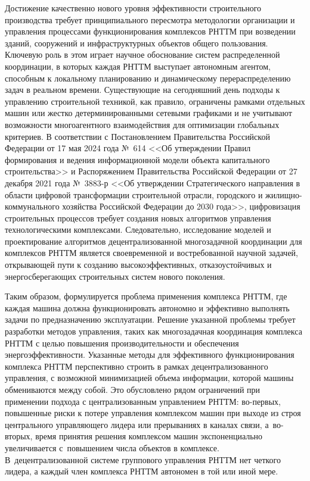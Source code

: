 Достижение качественно нового уровня эффективности строительного производства требует принципиального пересмотра методологии организации и управления процессами функционирования комплексов РНТТМ при возведении зданий, сооружений и инфраструктурных объектов общего пользования. Ключевую роль в этом играет научное обоснование систем распределенной координации, в которых каждая РНТТМ выступает автономным агентом, способным к локальному планированию и динамическому перераспределению задач в реальном времени. Существующие на сегодняшний день подходы к управлению строительной техникой, как правило, ограничены рамками отдельных машин или жестко детерминированными сетевыми графиками и не учитывают возможности многоагентного взаимодействия для оптимизации глобальных критериев. В соответствии с Постановлением Правительства Российской Федерации от 17 мая 2024 года №~614 <<Об утверждении Правил формирования и ведения информационной модели объекта капитального строительства>> и Распоряжением Правительства Российской Федерации от 27 декабря 2021 года №~3883-р <<Об утверждении Стратегического направления в области цифровой трансформации строительной отрасли, городского и жилищно-коммунального хозяйства Российской Федерации до 2030 года>>, цифровизация строительных процессов требует создания новых алгоритмов управления технологическими комплексами. Следовательно, исследование моделей и проектирование алгоритмов децентрализованной многозадачной координации для комплексов РНТТМ является своевременной и востребованной научной задачей, открывающей пути к созданию высокоэффективных, отказоустойчивых и энергосберегающих строительных систем нового поколения.

Таким образом, формулируется проблема применения комплекса РНТТМ, где каждая машина должна функционировать автономно и эффективно выполнять задачи по предназначению эксплуатации. Решение указанной проблемы требует разработки методов управления, таких как многозадачная координация комплекса РНТТМ с целью повышения производительности и обеспечения энергоэффективности. Указанные методы для эффективного функционирования комплекса РНТТМ перспективно строить в рамках децентрализованного управления, с возможной минимизацией объема информации, которой машины обмениваются между собой. Это обусловлено рядом ограничений при применении подхода с централизованным управлением РНТТМ: во-первых, повышенные риски к потере управления комплексом машин при выходе из строя центрального управляющего лидера или прерываниях в каналах связи, а~во-вторых, время принятия решения комплексом машин экспоненциально увеличивается с~повышением числа объектов в комплексе. В~децентрализованной системе группового управления РНТТМ нет четкого лидера, а каждый член комплекса РНТТМ автономен в той или иной мере.


